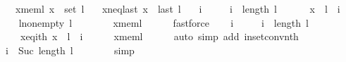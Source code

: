 \begin{isabellebody}
\ \ \ x{\isacharunderscore}{\kern0pt}mem{\isacharunderscore}{\kern0pt}l{\isacharcolon}{\kern0pt}\ {\isachardoublequoteopen}x\ {\isasymin}\ set\ l{\isachardoublequoteclose}\isanewline
\ \ \ x{\isacharunderscore}{\kern0pt}neq{\isacharunderscore}{\kern0pt}last{\isacharcolon}{\kern0pt}\ {\isachardoublequoteopen}x\ {\isasymnoteq}\ last\ l{\isachardoublequoteclose}\isanewline
\ \ \ i\ \isanewline
\ \ \ \ {\isachardoublequoteopen}i\ {\isacharless}{\kern0pt}\ length\ l\ {\isacharminus}{\kern0pt}\ {}{\isachardoublequoteclose}\isanewline
\ \ \ \ {\isachardoublequoteopen}x\ {\isacharequal}{\kern0pt}\ l\ {\isacharbang}{\kern0pt}\ i{\isachardoublequoteclose}%
\endisataginvisible
{\isafoldinvisible}%
%
\isadeliminvisible
\isanewline
%
\endisadeliminvisible
%
\isadelimproof
%
\endisadelimproof
%
\isatagproof
{}\isamarkupfalse%
\ {\isacharminus}{\kern0pt}\isanewline
\ \ \isamarkupfalse%
\ l{\isacharunderscore}{\kern0pt}non{\isacharunderscore}{\kern0pt}empty{\isacharcolon}{\kern0pt}\ {\isachardoublequoteopen}l\ {\isasymnoteq}\ {\isacharbrackleft}{\kern0pt}{\isacharbrackright}{\kern0pt}{\isachardoublequoteclose}\isanewline
\ \ \ \ \isamarkupfalse%
\ x{\isacharunderscore}{\kern0pt}mem{\isacharunderscore}{\kern0pt}l\isanewline
\ \ \ \ \isamarkupfalse%
\ fastforce\isanewline
\ \ \isamarkupfalse%
\ i\ \isanewline
\ \ \ \ {\isachardoublequoteopen}i\ {\isacharless}{\kern0pt}\ length\ l{\isachardoublequoteclose}\ \isanewline
\ \ \ \ x{\isacharunderscore}{\kern0pt}eq{\isacharunderscore}{\kern0pt}ith{\isacharcolon}{\kern0pt}\ {\isachardoublequoteopen}x\ {\isacharequal}{\kern0pt}\ l\ {\isacharbang}{\kern0pt}\ i{\isachardoublequoteclose}\isanewline
\ \ \ \ \isamarkupfalse%
\ x{\isacharunderscore}{\kern0pt}mem{\isacharunderscore}{\kern0pt}l\isanewline
\ \ \ \ \isamarkupfalse%
\ {\isacharparenleft}{\kern0pt}auto\ simp\ add{\isacharcolon}{\kern0pt}\ in{\isacharunderscore}{\kern0pt}set{\isacharunderscore}{\kern0pt}conv{\isacharunderscore}{\kern0pt}nth{\isacharparenright}{\kern0pt}\isanewline
\ \ \isamarkupfalse%
\ {\isachardoublequoteopen}i\ {\isacharless}{\kern0pt}\ Suc\ {\isacharparenleft}{\kern0pt}length\ l\ {\isacharminus}{\kern0pt}\ {}{\isacharparenright}{\kern0pt}{\isachardoublequoteclose}\isanewline
\ \ \ \ \isamarkupfalse%
\ simp\isanewline
\ \ \isamarkupfalse%
\ \isamarkupfalse%

\end{isabellebody}
